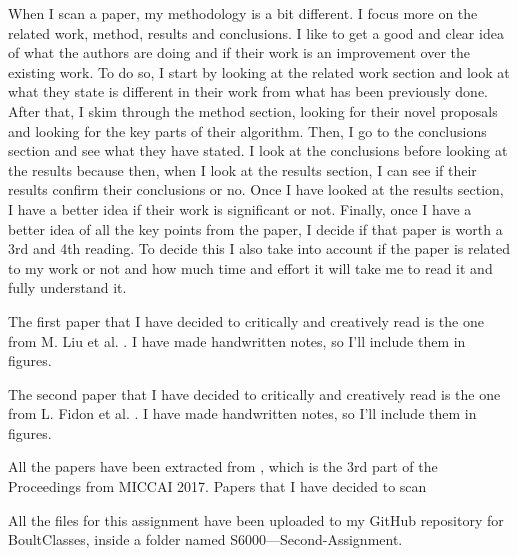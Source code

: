 \documentclass{article}
\begin{document}
When I scan a paper, my methodology is a bit different. I focus more on the related work, method, results and conclusions. I like to get a good and clear idea of what the authors are doing and if their work is an improvement over the existing work. To do so, I start by looking at the related work section and look at what they state is different in their work from what has been previously done. After that, I skim through the method section, looking for their novel proposals and looking for the key parts of their algorithm. Then, I go to the conclusions section and see what they have stated. I look at the conclusions before looking at the results because then, when I look at the results section, I can see if their results confirm their conclusions or no. Once I have looked at the results section, I have a better idea if their work is significant or not. Finally, once I have a better idea of all the key points from the paper, I decide if that paper is worth a 3rd and 4th reading. To decide this I also take into account if the paper is related to my work or not and how much time and effort it will take me to read it and fully understand it.


The first paper that I have decided to critically and creatively read is the one from M. Liu et al. \cite{10.1007/978-3-319-66179-7_1}. I have made handwritten notes, so I'll include them in figures.

The second paper that I have decided to critically and creatively read is the one from L. Fidon et al. \cite{10.1007/978-3-319-66179-7_33}. I have made handwritten notes, so I'll include them in figures.

All the papers have been extracted from \cite{MICCAI}, which is the 3rd part of the Proceedings from MICCAI 2017. 
Papers that I have decided to scan \cite{10.1007/978-3-319-66179-7_1,10.1007/978-3-319-66179-7_5,10.1007/978-3-319-66179-7_10,10.1007/978-3-319-66179-7_26,10.1007/978-3-319-66179-7_27,10.1007/978-3-319-66179-7_33,10.1007/978-3-319-66179-7_36,10.1007/978-3-319-66179-7_38}

All the files for this assignment have been uploaded to my GitHub repository for BoultClasses, inside a folder named S6000---Second-Assignment.
\end{document}
